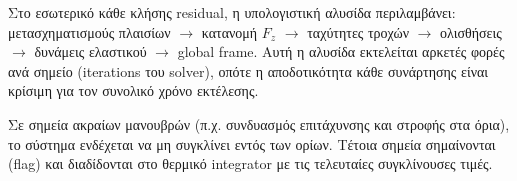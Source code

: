 Στο εσωτερικό κάθε κλήσης residual, η υπολογιστική αλυσίδα περιλαμβάνει: μετασχηματισμούς
πλαισίων $\to$ κατανομή $F_z$ $\to$ ταχύτητες τροχών $\to$ ολισθήσεις $\to$ δυνάμεις
ελαστικού $\to$ global frame. Αυτή η αλυσίδα εκτελείται αρκετές φορές ανά σημείο
(iterations του solver), οπότε η αποδοτικότητα κάθε συνάρτησης είναι κρίσιμη για τον
συνολικό χρόνο εκτέλεσης.

Σε σημεία ακραίων μανουβρών (π.χ. συνδυασμός επιτάχυνσης και στροφής στα όρια), το σύστημα
ενδέχεται να μη συγκλίνει εντός των ορίων. Τέτοια σημεία σημαίνονται (flag) και
διαδίδονται στο θερμικό integrator με τις τελευταίες συγκλίνουσες τιμές.


